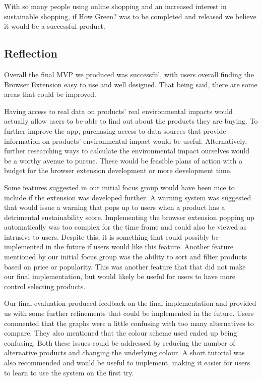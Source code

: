 \documentclass[a4,10pt,twocolumn]{article}
\begin{document}
With so many people using online shopping and an increased interest in sustainable shopping, if How Green? was to be completed and released we believe it would be a successful product.

\subsection*{Reflection}
Overall the final MVP we produced was successful, with users overall finding the Browser Extension easy to use and well designed. That being said, there are some areas that could be improved.

Having access to real data on products' real environmental impacts would actually allow users to be able to find out about the products they are buying. To further improve the app, purchasing access to data sources that provide information on products' environmental impact would be useful. Alternatively, further researching ways to calculate the environmental impact ourselves would be a worthy avenue to pursue. These would be feasible plans of action with a budget for the browser extension development or more development time.

Some features suggested in our initial focus group would have been nice to include if the extension was developed further. A warning system was suggested that would issue a warning that pops up to users when a product has a detrimental sustainability score. Implementing the browser extension popping up automatically was too complex for the time frame and could also be viewed as intrusive to users. Despite this, it is something that could possibly be implemented in the future if users would like this feature. Another feature mentioned by our initial focus group was the ability to sort and filter products based on price or popularity. This was another feature that that did not make our final implementation, but would likely be useful for users to have more control selecting products.

Our final evaluation produced feedback on the final implementation and provided us with some further refinements that could be implemented in the future. Users commented that the graphs were a little confusing with too many alternatives to compare. They also mentioned that the colour scheme used ended up being confusing. Both these issues could be addressed by reducing the number of alternative products and changing the underlying colour. A short tutorial was also recommended and would be useful to implement, making it easier for users to learn to use the system on the first try.
\end{document}
